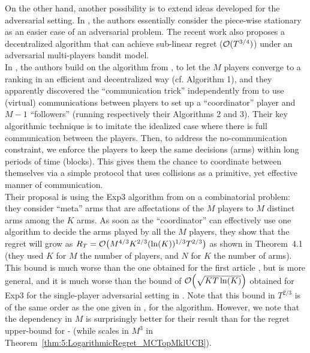 On the other hand, another possibility is to extend ideas developed for the adversarial setting.
In \cite{AlaturLevyKrause19}, the authors essentially consider the piece-wise stationary as an easier case of an adversarial problem.
The recent work \cite{bande2019adversarial} also proposes a decentralized algorithm that can achieve sub-linear regret ($\mathcal{O}(T^{3/4})$) under an adversarial multi-players bandit model.
\\
\indent
In \cite{AlaturLevyKrause19}, the authors build on the \MusicalChair{} algorithm from \cite{Rosenski16}, to let the $M$ players converge to a ranking in an efficient and decentralized way (cf. Algorithm 1), and they apparently discovered the ``communication trick'' independently from \cite{BoursierPerchet18} to use (virtual) communications between players to set up a ``coordinator'' player and $M-1$ ``followers'' (running respectively their Algorithms 2 and 3).
%
Their key algorithmic technique is to imitate the idealized case where there is full communication between the players. Then, to address the no-communication constraint, we enforce the players to keep the same decisions (arms) within long periods of time (blocks). This gives them the chance to coordinate between themselves via a simple protocol that uses collisions as a primitive, yet effective manner of communication.\\
%
\indent
Their proposal is using the Exp3 algorithm from \cite{Auer02NonStochastic} on a combinatorial problem: they consider ``meta'' arms that are affectations of the $M$ players to $M$ distinct arms among the $K$ arms.
As soon as the ``coordinator'' can effectively use one algorithm to decide the arms played by all the $M$ players, they show that the regret will grow as $R_T = \mathop{}\mathopen{}\mathcal{O}\mathopen{}\left(M^{4/3} K^{2/3} (\ln(K))^{1/3} T^{2/3}\right)$ as shown in Theorem~4.1
(they used $K$ for $M$ the number of players, and $N$ for $K$ the number of arms).
This bound is much worse than the one obtained for the first article \cite{WeiSrivastava18Distributed}, but is more general, and it is much worse than the bound of $\mathop{}\mathopen{}\mathcal{O}\mathopen{}\left(\sqrt{K T \ln(K)}\right)$ obtained for Exp3 for the single-player adversarial setting in \cite{Auer02NonStochastic}.
Note that this bound in $T^{2/3}$ is of the same order as the one given in \cite{Avner15}, for the \MEGA{} algorithm.
However, we note that the dependency in $M$ is surprisingly better for their result than for the regret upper-bound for \MCTopM-\klUCB{} (while scales in $M^3$ in Theorem~\ref{thm:5:LogarithmicRegret_MCTopMklUCB}).\\
\indent
